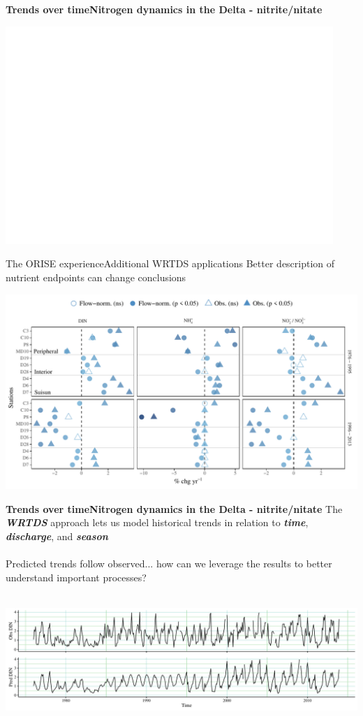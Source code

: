 \documentclass[serif]{beamer}\usepackage[]{graphicx}\usepackage[]{color}
\newcommand{\emtxt}[1]{\textbf{\textit{#1}}}
\begin{document}
\begin{frame}{\textbf{Trends over time}}{\textbf{Nitrogen dynamics in the Delta - nitrite/nitate}} 
\centerline{\includegraphics[width = 0.93\textwidth, page = 2]{fig/trndsperno23.pdf}}
\end{frame}

\begin{frame}{The ORISE experience}{Additional WRTDS applications}
Better description of nutrient endpoints can change conclusions
\centerline{\includegraphics[width = \textwidth]{fig/trndcomp1.pdf}}
\end{frame}



\begin{frame}{\textbf{Trends over time}}{\textbf{Nitrogen dynamics in the Delta - nitrite/nitate}} 
The \emtxt{WRTDS} approach lets us model historical trends in relation to \emtxt{time}, \emtxt{discharge}, and \emtxt{season}\\~\\
Predicted trends follow observed... how can we leverage the results to better understand important processes? \\~\\
\centerline{\includegraphics[width = \textwidth]{fig/ts_ex2.pdf}}
\end{frame}
\end{document}
